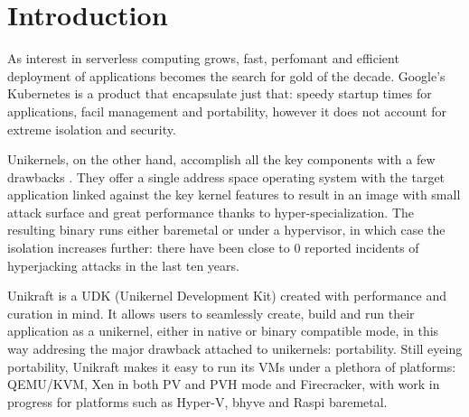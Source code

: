 \chapter{Introduction}
\label{chapter:intro}

As interest in serverless computing grows, fast, perfomant and efficient deployment of applications becomes the search for gold of the decade.
Google's Kubernetes \cite{k8s} is a product that encapsulate just that: speedy startup times for applications, facil management and portability, however it does not account for extreme isolation and security.

Unikernels, on the other hand, accomplish all the key components with a few drawbacks \cite{vm-safer}.
They offer a single address space operating system with the target application linked against the key kernel features to result in an image with small attack surface and great performance thanks to hyper-specialization.
The resulting binary runs either baremetal or under a hypervisor, in which case the isolation increases further: there have been close to 0 reported incidents of hyperjacking attacks in the last ten years.

Unikraft is a UDK (Unikernel Development Kit) \cite{unikraft} created with performance and curation in mind.
It allows users to seamlessly create, build and run their application as a unikernel, either in native or binary compatible mode, in this way addresing the major drawback attached to unikernels: portability.
Still eyeing portability, Unikraft makes it easy to run its VMs under a plethora of platforms: QEMU/KVM, Xen in both PV and PVH mode and Firecracker, with work in progress for platforms such as Hyper-V, bhyve and Raspi baremetal.
